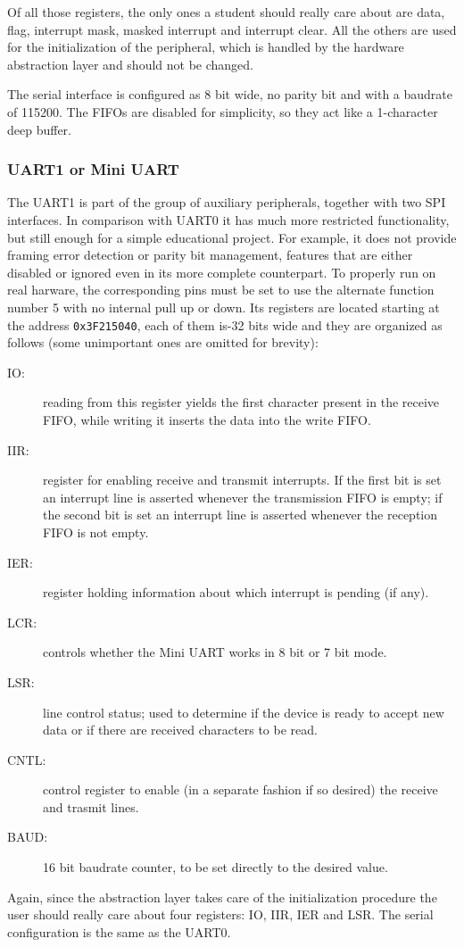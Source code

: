 \documentclass[12pt,a4paper,openright,twoside]{report}
\begin{document}
Of all those registers, the only ones a student should really care about are
data, flag, interrupt mask, masked interrupt and interrupt clear. All the others 
are used for the initialization of the peripheral, which is handled by the 
hardware abstraction layer and should not be changed.

The serial interface is configured as 8 bit wide, no parity bit and with
a baudrate of 115200. The FIFOs are disabled for simplicity, so they act like 
a 1-character deep buffer.

\newpage

\subsubsection{UART1 or Mini UART}
The UART1 is part of the group of auxiliary peripherals, together with two SPI
interfaces. In comparison with UART0 it has much more restricted functionality,
but still enough for a simple educational project. For example, it does not 
provide framing error detection or parity bit management, features that are either
disabled or ignored even in its more complete counterpart.
To properly run on real harware, the corresponding pins must be set to use the
alternate function number 5 with no internal pull up or down.
Its registers are located starting at the address {\tt 0x3F215040}, each of them is-32 bits
wide and they are organized as follows (some unimportant ones are omitted for brevity):

\begin{description}
    \item[IO:] reading from this register yields the first character present in the
            receive FIFO, while writing it inserts the data into the write FIFO.
    \item[IIR:] register for enabling receive and transmit interrupts. If the first
            bit is set an interrupt line is asserted whenever the transmission FIFO
            is empty; if the second bit is set an interrupt line is asserted whenever
            the reception FIFO is not empty.
    \item[IER:] register holding information about which interrupt is pending (if any).
    \item[LCR:] controls whether the Mini UART works in 8 bit or 7 bit mode.
    \item[LSR:] line control status; used to determine if the device is ready to 
            accept new data or if there are received characters to be read.
    \item[CNTL:] control register to enable (in a separate fashion if so desired)
            the receive and trasmit lines.
    \item[BAUD:] 16 bit baudrate counter, to be set directly to the desired value.
\end{description}
Again, since the abstraction layer takes care of the initialization procedure
the user should really care about four registers: IO, IIR, IER and LSR.
The serial configuration is the same as the UART0.
\end{document}
